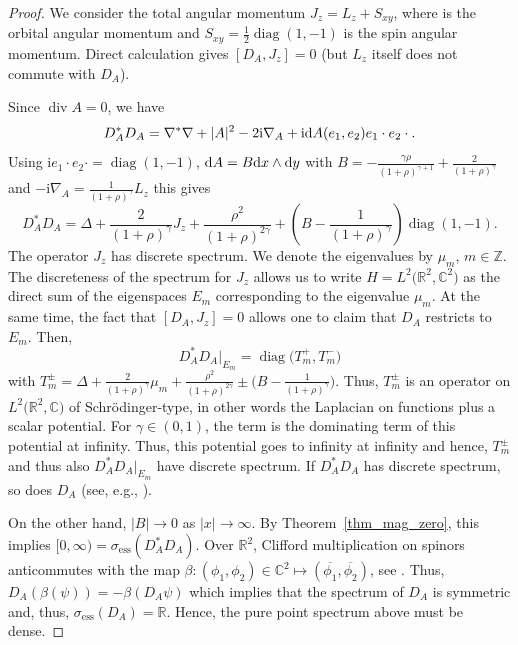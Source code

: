 \documentclass[10pt,a4paper]{amsart}
\numberwithin{equation}{section}
\begin{document}
\begin{proof}We consider the total angular momentum $J_z=L_z+S_{xy}$, where 
is the orbital angular momentum and $S_{xy}=\frac{\mathrm{1}}{2}\operatorname{diag}(1, -1)$ is the spin angular momentum. Direct calculation gives $[D_A, J_z]=0$ (but $L_z$ itself does not commute with $D_A$).
	
Since $\operatorname{div} A=0$, we have
\[ D_A^*D_A= \nabla^*\nabla + |A|^2 - 2{\mathrm{i}}  \nabla_A + {\mathrm{i}}  {\rm d}A(e_1,e_2)e_1\cdot e_2\cdot . \]	
Using ${\mathrm{i}}  e_1\cdot e_2 \cdot = \operatorname{diag}(1,-1)$, ${\rm d}A=B {\rm d}x\wedge {\rm d}y$ with $B= -\frac{\gamma \rho}{(1+\rho)^{\gamma +1}} + \frac{2}{(1+\rho)^{\gamma}}$ and $-{\mathrm{i}}\nabla_A =\frac{1}{(1+\rho)^{\gamma}}L_z$ this gives	
\[ D_A^*D_A = \Delta + \frac{2}{(1+\rho)^{\gamma}}J_z + \frac{\rho^2}{(1+\rho)^{2\gamma}} + \left(B -\frac{1}{(1+\rho)^{\gamma}}\right)\operatorname{diag}(1,-1).\]
The operator $J_z$ has discrete spectrum. We denote the eigenvalues by $\mu_m$, $m\in \mathbb Z$. The discreteness of the spectrum for $J_z$ allows us to write $H=L^2\bigl({\mathbb R}^2, {\mathbb C}^2\bigr)$ as the direct sum of the eigenspaces $E_m$ corresponding to the eigenvalue $\mu_m$. At the same time, the fact that $[D_A, J_z]=0$ allows one to claim that $D_A$ restricts to $E_m$. Then,
\[ D_A^*D_A|_{E_m}= \operatorname{diag}\bigl(T^+_m, T^-_m\bigr) \]
with $T^\pm_m= \Delta + \frac{2}{(1+\rho)^{\gamma}}\mu_m + \frac{\rho^2}{(1+\rho)^{2\gamma}} \pm \bigl(B -\frac{1}{(1+\rho)^{\gamma}}\bigr)$.
Thus, $T_m^\pm$ is an operator on $L^2\bigl({\mathbb R}^2, {\mathbb C}\bigr)$ of Schr\"odinger-type, in other words the Laplacian on functions plus a scalar potential. For $\gamma\in (0,1)$, the term  is the dominating term of this potential at infinity. Thus, this potential goes to infinity at infinity and hence, $T_m^\pm$ and thus also $ D_A^*D_A|_{E_m}$ have discrete spectrum. If $D_A^*D_A$ has discrete spectrum, so does $D_A$ (see, e.g., \cite[Lemma~B.8]{AG}).
	
On the other hand, $|B|\to 0$ as $|x|\to \infty$. By Theorem~\ref{thm_mag_zero}, this implies $[0,\infty)=\sigma_{\mathrm{ess}} (D_A^*D_A)$. Over ${\mathbb R}^2$, Clifford multiplication on spinors anticommutes with the map $\beta\colon (\phi_1, \phi_2)\in {\mathbb C}^2\mapsto (\overline{\phi_1}, \overline{\phi_2})$, see \cite[Section~1.7]{Fr}. Thus, $D_A(\beta(\psi))=-\beta(D_A\psi)$ which implies that the spectrum of $D_A$ is symmetric and, thus, $\sigma_{\mathrm{ess}} (D_A)={\mathbb R}$. Hence, the pure point spectrum above must be dense.
\end{proof}	
\end{document}

